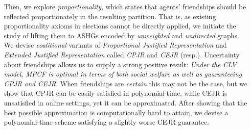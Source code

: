\documentclass[letterpaper]{article} %
\begin{document}
%

Then, we explore \textit{proportionality}, which states that agents’ friendships should be reflected proportionately in the resulting partition. That is, as existing proportionality axioms in elections cannot be directly applied, we initiate the study of lifting them to ASHGs encoded by \textit{unweighted} and \textit{undirected} graphs. We devise \textit{coalitional} variants of \textit{Proportional Justified Representation} \cite{sanchez2017proportional} and \textit{Extended Justified Representation}  \cite{aziz2017justified} called \textit{CPJR} and \textit{CEJR} (resp.). Uncertainty about friendships allows us to supply a strong positive result: \textit{Under the CLV model, MPCF is optimal in terms of both social welfare as well as guaranteeing CPJR and CEJR}. %
When friendships are \textit{certain} this may not be the case, but we show that CPJR can be easily satisfied in polynomial-time, while CEJR is unsatisfied in online settings, yet it can be approximated. After showing that the best possible approximation is computationally hard to attain, we devise a polynomial-time scheme satisfying a slightly worse CEJR guarantee. %

%
\end{document}

